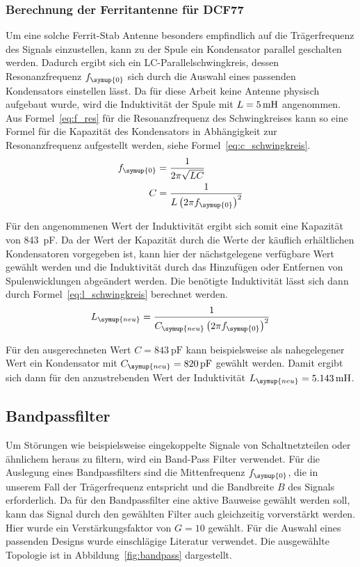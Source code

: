 \documentclass[a4paper]{scrartcl}
\begin{document}
\subsubsection{Berechnung der Ferritantenne für DCF77}
Um eine solche Ferrit-Stab Antenne besonders empfindlich auf die Trägerfrequenz des Signals einzustellen, kann zu der Spule ein Kondensator parallel geschalten werden.
Dadurch ergibt sich ein LC-Parallelschwingkreis, dessen Resonanzfrequenz \(f_{\symup{0}}\) sich durch die Auswahl eines passenden Kondensators einstellen lässt.
Da für diese Arbeit keine Antenne physisch aufgebaut wurde, wird die Induktivität der Spule mit \(L=\qty{5}{\mH}\) angenommen. Aus Formel~\eqref{eq:f_res} für die Resonanzfrequenz des Schwingkreises kann so eine Formel für die Kapazität des Kondensators in Abhängigkeit zur Resonanzfrequenz aufgestellt werden, siehe Formel~\eqref{eq:c_schwingkreis}.
\begin{align}
    f_{\symup{0}} &= \frac{1}{2\pi\sqrt{LC}} \label{eq:f_res} \\
    C &= \frac{1}{L\left(2\pi f_{\symup{0}}\right)^2} \label{eq:c_schwingkreis}
\end{align}

Für den angenommenen Wert der Induktivität ergibt sich somit eine Kapazität von \qty{843}{\pico\farad}.
Da der Wert der Kapazität durch die Werte der käuflich erhältlichen Kondensatoren vorgegeben ist, kann hier der nächstgelegene verfügbare Wert gewählt werden und die Induktivität durch das Hinzufügen oder Entfernen von Spulenwicklungen abgeändert werden. Die benötigte Induktivität lässt sich dann durch Formel~\eqref{eq:l_schwingkreis} berechnet werden.
\begin{equation}
    L_{\symup{neu}} = \frac{1}{C_{\symup{neu}} \left(2\pi f_{\symup{0}} \right)^2}
\end{equation}

Für den ausgerechneten Wert \(C = \qty{843}{\pico\farad}\) kann beispielsweise als nahegelegener Wert ein Kondensator mit \(C_{\symup{neu}} = \qty{820}{\pico\farad}\) gewählt werden.
Damit ergibt sich dann für den anzustrebenden Wert der Induktivität \(L_{\symup{neu}} = \qty{5.143}{\mH}\).

\subsection{Bandpassfilter}
Um Störungen wie beispielsweise eingekoppelte Signale von Schaltnetzteilen oder ähnlichem heraus zu filtern, wird ein Band-Pass Filter verwendet.
Für die Auslegung eines Bandpassfilters sind die Mittenfrequenz \(f_{\symup{0}}\), die in unserem Fall der Trägerfrequenz entspricht und die Bandbreite \(B\) des Signals erforderlich.
Da für den Bandpassfilter eine aktive Bauweise gewählt werden soll, kann das Signal durch den gewählten Filter auch gleichzeitig vorverstärkt werden. Hier wurde ein Verstärkungsfaktor von \(G= 10\) gewählt.
Für die Auswahl eines passenden Designs wurde einschlägige Literatur verwendet. Die ausgewählte Topologie ist in Abbildung~\ref{fig:bandpass} dargestellt.
\end{document}
